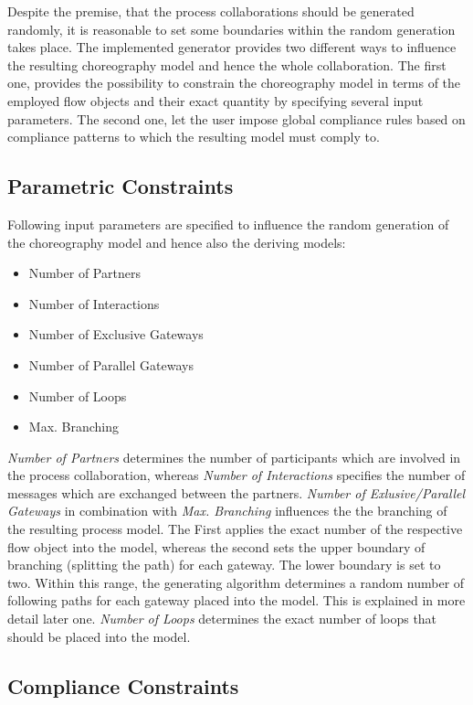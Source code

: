 Despite the premise, that the process collaborations should be generated randomly, it is reasonable to set some boundaries within the random generation takes place. The implemented generator provides two different ways to influence the resulting choreography model and hence the whole collaboration. The first one, provides the possibility to constrain the choreography model in terms of the employed flow objects and their exact quantity by specifying several input parameters. The second one, let the user impose global compliance rules based on compliance patterns to which the resulting model must comply to.

\subsection{Parametric Constraints} \label{sec:param_constraints}

Following input parameters are specified to influence the random generation of the choreography model and hence also the deriving models:

\begin{itemize}
\item Number of Partners
\item Number of Interactions
\item Number of Exclusive Gateways
\item Number of Parallel Gateways
\item Number of Loops
\item Max. Branching
\end{itemize}

\textit{Number of Partners} determines the number of participants which are involved in the process collaboration, whereas \textit{Number of Interactions} specifies the number of messages which are exchanged between the partners. \textit{Number of Exlusive/Parallel Gateways} in combination with \textit{Max. Branching} influences the the branching of the resulting process model. The First applies the exact number of the respective flow object into the model, whereas the second sets the upper boundary of branching (splitting the path) for each gateway. The lower boundary is set to two. Within this range, the generating algorithm determines a random number of following paths for each gateway placed into the model. This is explained in more detail later one. \textit{Number of Loops} determines the exact number of loops that should be placed into the model.

\subsection{Compliance Constraints}

